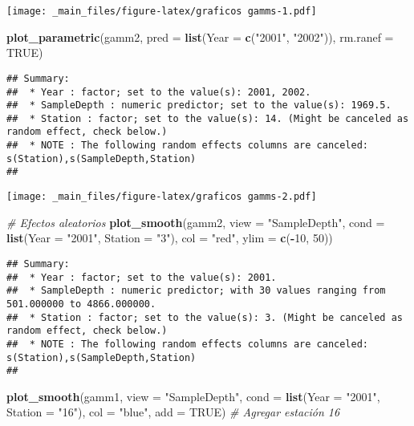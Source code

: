 \documentclass[
]{book}
\newenvironment{Shaded}{\begin{snugshade}}{\end{snugshade}}
\newcommand{\CommentTok}[1]{\textcolor[rgb]{0.56,0.35,0.01}{\textit{#1}}}
\newcommand{\DataTypeTok}[1]{\textcolor[rgb]{0.13,0.29,0.53}{#1}}
\newcommand{\DecValTok}[1]{\textcolor[rgb]{0.00,0.00,0.81}{#1}}
\newcommand{\KeywordTok}[1]{\textcolor[rgb]{0.13,0.29,0.53}{\textbf{#1}}}
\newcommand{\NormalTok}[1]{#1}
\newcommand{\OperatorTok}[1]{\textcolor[rgb]{0.81,0.36,0.00}{\textbf{#1}}}
\newcommand{\OtherTok}[1]{\textcolor[rgb]{0.56,0.35,0.01}{#1}}
\newcommand{\StringTok}[1]{\textcolor[rgb]{0.31,0.60,0.02}{#1}}
\begin{document}
\texttt{[image: \_main\_files/figure-latex/graficos gamms-1.pdf]}

\begin{Shaded}
\begin{Highlighting}[]
\KeywordTok{plot_parametric}\NormalTok{(gamm2, }\DataTypeTok{pred =} \KeywordTok{list}\NormalTok{(}\DataTypeTok{Year =} \KeywordTok{c}\NormalTok{(}\StringTok{"2001"}\NormalTok{, }\StringTok{"2002"}\NormalTok{)), }\DataTypeTok{rm.ranef =} \OtherTok{TRUE}\NormalTok{)}
\end{Highlighting}
\end{Shaded}

\begin{verbatim}
## Summary:
##  * Year : factor; set to the value(s): 2001, 2002. 
##  * SampleDepth : numeric predictor; set to the value(s): 1969.5. 
##  * Station : factor; set to the value(s): 14. (Might be canceled as random effect, check below.) 
##  * NOTE : The following random effects columns are canceled: s(Station),s(SampleDepth,Station)
## 
\end{verbatim}

\texttt{[image: \_main\_files/figure-latex/graficos gamms-2.pdf]}

\begin{Shaded}
\begin{Highlighting}[]
\CommentTok{# Efectos aleatorios}
\KeywordTok{plot_smooth}\NormalTok{(gamm2, }\DataTypeTok{view =} \StringTok{"SampleDepth"}\NormalTok{, }\DataTypeTok{cond =} \KeywordTok{list}\NormalTok{(}\DataTypeTok{Year =} \StringTok{"2001"}\NormalTok{, }\DataTypeTok{Station =} \StringTok{"3"}\NormalTok{), }\DataTypeTok{col =} \StringTok{"red"}\NormalTok{, }\DataTypeTok{ylim =} \KeywordTok{c}\NormalTok{(}\OperatorTok{-}\DecValTok{10}\NormalTok{, }\DecValTok{50}\NormalTok{))}
\end{Highlighting}
\end{Shaded}

\begin{verbatim}
## Summary:
##  * Year : factor; set to the value(s): 2001. 
##  * SampleDepth : numeric predictor; with 30 values ranging from 501.000000 to 4866.000000. 
##  * Station : factor; set to the value(s): 3. (Might be canceled as random effect, check below.) 
##  * NOTE : The following random effects columns are canceled: s(Station),s(SampleDepth,Station)
## 
\end{verbatim}

\begin{Shaded}
\begin{Highlighting}[]
\KeywordTok{plot_smooth}\NormalTok{(gamm1, }\DataTypeTok{view =} \StringTok{"SampleDepth"}\NormalTok{, }\DataTypeTok{cond =} \KeywordTok{list}\NormalTok{(}\DataTypeTok{Year =} \StringTok{"2001"}\NormalTok{, }\DataTypeTok{Station =} \StringTok{"16"}\NormalTok{), }\DataTypeTok{col =} \StringTok{"blue"}\NormalTok{, }\DataTypeTok{add =} \OtherTok{TRUE}\NormalTok{) }\CommentTok{# Agregar estación 16}
\end{Highlighting}
\end{Shaded}
\end{document}
